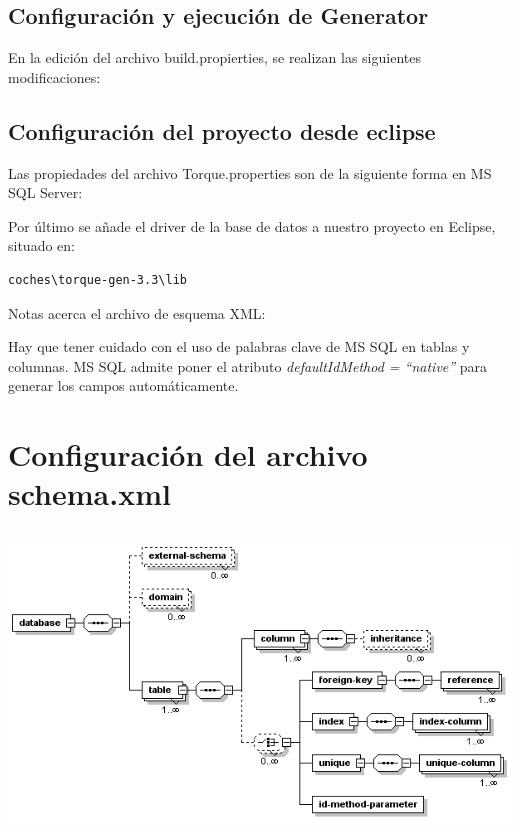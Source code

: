 \documentclass[12pt, oneside]{article}
\begin{document}
\subsection{Configuración y ejecución de Generator}
En la edición del archivo build.propierties, se realizan las siguientes modificaciones:



\subsection{Configuración del proyecto desde eclipse}
Las propiedades del archivo Torque.properties son de la siguiente forma en MS SQL Server:


Por último se añade el driver de la base de datos a nuestro proyecto en Eclipse, situado en:
\begin{lstlisting}
coches\torque-gen-3.3\lib
\end{lstlisting}


Notas acerca el archivo de esquema XML:

Hay que tener cuidado con el uso de palabras clave de MS SQL en tablas y columnas. 
MS SQL admite poner el atributo {\em defaultIdMethod = “native”} para generar los campos automáticamente.

\section{Configuración del archivo schema.xml}
\begin{center}
	\includegraphics[height=8cm]{img/xml-config.png}
\end{center}
	
\end{document}
